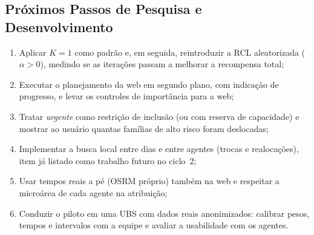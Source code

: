 \documentclass[11pt,a4paper]{article}
\begin{document}
\subsection{Próximos Passos de Pesquisa e Desenvolvimento}
\begin{enumerate}
    \item Aplicar $K=1$ como padrão e, em seguida, reintroduzir a RCL aleatorizada ($\alpha > 0$), medindo se as iterações passam a melhorar a recompensa total;
    \item Executar o planejamento da web em segundo plano, com indicação de progresso, e levar os controles de importância para a web;
    \item Tratar \emph{urgente} como restrição de inclusão (ou com reserva de capacidade) e mostrar ao usuário quantas famílias de alto risco foram deslocadas;
    \item Implementar a busca local entre dias e entre agentes (trocas e realocações), item já listado como trabalho futuro no ciclo~2;
    \item Usar tempos reais a pé (OSRM próprio) também na web e respeitar a microárea de cada agente na atribuição;
    \item Conduzir o piloto em uma UBS com dados reais anonimizados: calibrar pesos, tempos e intervalos com a equipe e avaliar a usabilidade com os agentes.
\end{enumerate}
\end{document}
